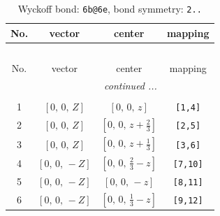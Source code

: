 \documentclass[fleqn,8pt]{jsarticle}
\begin{document}
\begin{longtable}{cccc}
\caption{Wyckoff bond: {\tt 6b@6e}, bond symmetry: {\tt 2..}}
 \\
 \hline \hline
No. & vector & center & mapping \\ \hline \endfirsthead

\multicolumn{3}{l}{\tablename\ \thetable{}} \\
 \hline \hline
No. & vector & center & mapping \\ \hline \endhead

 \hline \hline
\multicolumn{3}{r}{\footnotesize\it continued ...} \\ \endfoot

 \hline \hline
\multicolumn{3}{r}{} \\ \endlastfoot

1 & $\left[ 0,\, 0,\, Z \right]$ & $\left[ 0,\, 0,\, z \right]$ & {\tt [1,4]} \\ \hline
2 & $\left[ 0,\, 0,\, Z \right]$ & $\left[ 0,\, 0,\, z + \frac{2}{3} \right]$ & {\tt [2,5]} \\ \hline
3 & $\left[ 0,\, 0,\, Z \right]$ & $\left[ 0,\, 0,\, z + \frac{1}{3} \right]$ & {\tt [3,6]} \\ \hline
4 & $\left[ 0,\, 0,\, - Z \right]$ & $\left[ 0,\, 0,\, \frac{2}{3} - z \right]$ & {\tt [7,10]} \\ \hline
5 & $\left[ 0,\, 0,\, - Z \right]$ & $\left[ 0,\, 0,\, - z \right]$ & {\tt [8,11]} \\ \hline
6 & $\left[ 0,\, 0,\, - Z \right]$ & $\left[ 0,\, 0,\, \frac{1}{3} - z \right]$ & {\tt [9,12]} \\
\end{longtable}
\renewcommand{\arraystretch}{1.2}
\end{document}
